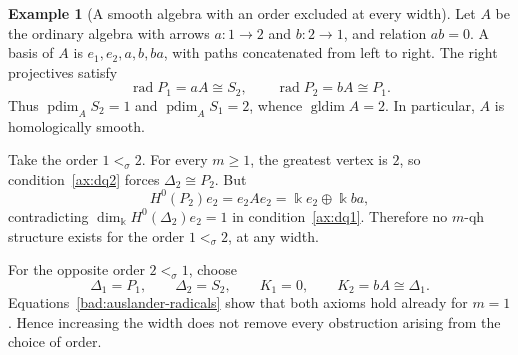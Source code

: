 \documentclass[11pt,a4paper]{article}
\newcommand{\std}{\Delta}
\DeclareMathOperator{\rad}{rad}
\theoremstyle{plain}
\theoremstyle{definition}
\newtheorem{example}[theorem]{Example}
\numberwithin{equation}{section}
\begin{document}
\begin{example}[A smooth algebra with an order excluded at every width]
\label{bad:forbidden-order}
Let $A$ be the ordinary algebra with arrows $a:1\to2$ and
$b:2\to1$, and relation $ab=0$. A basis of $A$ is
$e_1,e_2,a,b,ba$, with paths concatenated from left to right.
The right projectives satisfy
\begin{equation}\label{bad:auslander-radicals}
 \rad P_1=aA\cong S_2,\qquad
 \rad P_2=bA\cong P_1.
\end{equation}
Thus $\operatorname{pdim}_A S_2=1$ and
$\operatorname{pdim}_A S_1=2$, whence
$\operatorname{gldim}A=2$. In particular, $A$ is homologically smooth.

Take the order $1<_\sigma2$. For every $m\geq1$,
the greatest vertex is $2$, so condition~\ref{ax:dq2} forces
$\std_2\cong P_2$. But
\begin{equation}\label{bad:auslander-diagonal}
 H^0(P_2)e_2=e_2Ae_2=\Bbbk e_2\oplus\Bbbk ba,
\end{equation}
contradicting $\dim_{\Bbbk}H^0(\std_2)e_2=1$ in
condition~\ref{ax:dq1}. Therefore no $m$-qh structure exists for
the order $1<_\sigma2$, at any width.

For the opposite order $2<_\sigma1$, choose
\[
 \std_1=P_1,\qquad\std_2=S_2,\qquad
 K_1=0,\qquad K_2=bA\cong\std_1.
\]
Equations~\eqref{bad:auslander-radicals} show that both axioms hold
already for $m=1$. Hence increasing the width does not remove every
obstruction arising from the choice of order.
\end{example}
\end{document}
